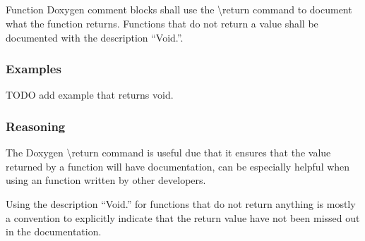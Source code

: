 \subsection*{\doxygenRule{}}

Function Doxygen comment blocks shall use the \textbackslash return command to document what the function returns. Functions that do not return a value shall be documented with the description ``Void.''.    %

\subsubsection*{Examples}

\noindent
\begin{minipage}[t]{0.48\textwidth}
    

\end{minipage}\hfill
\begin{minipage}[t]{0.48\textwidth}
    
\end{minipage}

TODO add example that returns void.

\subsubsection*{Reasoning}

The Doxygen \textbackslash return command is useful due that it ensures that the value returned by a function will have documentation, can be especially helpful when using an function written by other developers.

Using the description ``Void.'' for functions that do not return anything is mostly a convention to explicitly indicate that the return value have not been missed out in the documentation.    %